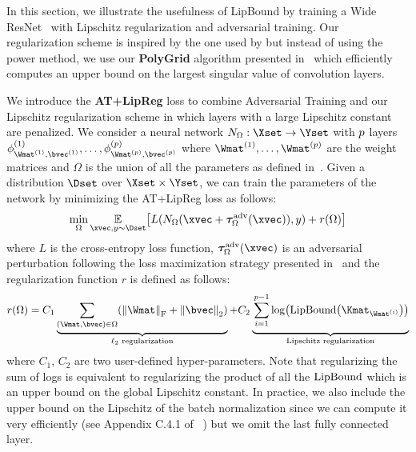 In this section, we illustrate the usefulness of LipBound by training a Wide ResNet~\citep{zagoruyko2016wide} with Lipschitz regularization and adversarial training.
Our regularization scheme is inspired by the one used by \citet{yoshida2017spectral} but instead of using the power method, we use our \textbf{PolyGrid} algorithm presented in~ which efficiently computes an upper bound on the largest singular value of convolution layers.

We introduce the \textbf{AT+LipReg} loss to combine Adversarial Training and our Lipschitz regularization scheme in which layers with a large Lipschitz constant are penalized.
We consider a neural network $N_\Omega : \Xset \rightarrow \Yset$ with $p$ layers $\phi^{(1)}_{\Wmat^{(1)}, \bvec^{(1)}}, \dots, \phi^{(\depth)}_{\Wmat^{(\depth)}, \bvec^{(\depth)}}$ where $\Wmat^{(1)}, \dots, \Wmat^{(\depth)}$ are the weight matrices and $\Omega$ is the union of all the parameters as defined in~.
Given a distribution $\Dset$ over $\Xset \times \Yset$, we can train the parameters of the network by minimizing the AT+LipReg loss as follows:
\begin{equation} \label{equation:ch5-obj_function}
  \min_{\Omega} \Ebb_{\xvec,y \sim \Dset} \left[ L(N_\Omega(\xvec + \adv^{\text{adv}}_\Omega(\xvec)), y) + r(\Omega) \right]
\end{equation}
where $L$ is the cross-entropy loss function, $\adv^{\text{adv}}_\Omega(\xvec)$ is an adversarial perturbation following the loss maximization strategy presented in~ and the regularization function $r$ is defined as follows:
\begin{equation}
  r(\Omega) =  C_1 \underbrace{\sum_{(\Wmat, \bvec) \in \Omega} \left( \norm{\Wmat}_\fro + \norm{\bvec}_2 \right)}_{
  \text{$\ell_2$ regularization}} + C_2 \underbrace{\vphantom{\sum_{(\Wmat, \bvec) \in \Omega}} \sum_{i=1}^{\depth-1} \log\left(\lipbound\left(\Kmat_{\Wmat^{(i)}}\right)\right)}_{\text{Lipschitz regularization}} 
\end{equation}
where $C_1$, $C_2$ are two user-defined hyper-parameters.
Note that regularizing the sum of logs is equivalent to regularizing the product of all the $\mathrm{LipBound}$ which is an upper bound on the global Lipschitz constant.
In practice, we also include the upper bound on the Lipschitz of the batch normalization since we can compute it very efficiently (see Appendix C.4.1 of ~\citet{tsuzuku2018lipschitz}) but we omit the last fully connected layer.

